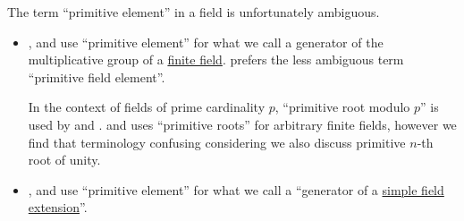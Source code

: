 \begin{remark}\label{rem:primitive_element_terminology}
  The term \enquote{primitive element} in a field is unfortunately ambiguous.

  \begin{itemize}
    \item \Textcite[66]{Rotman2015AdvancedModernAlgebraPart1}, \textcite[124]{Albert1956HigherAlgebra} and \textcite[def. 2.9]{LidlNiederreiter1997FiniteFields} use \enquote{primitive element} for what we call a generator of the multiplicative group of a \hyperref[def:finite_field]{finite field}. \Textcite[89]{Berlekamp2015AlgebraicCodingTheory} prefers the less ambiguous term \enquote{primitive field element}.

    In the context of fields of prime cardinality \( p \), \enquote{primitive root modulo \( p \)} is used by \textcite[12]{Gentle2006RandomNumberGeneration} and \textcite[def. 4.4.3]{Rosen2019DiscreteMathematics}. \Textcite[125]{Albert1956HigherAlgebra} and \textcite[thm. 11.2.2]{Hall1986CombinatorialTheory} uses \enquote{primitive roots} for arbitrary finite fields, however we find that terminology confusing considering we also discuss primitive \( n \)-th root of unity.

    \item \Textcite[A.V.40]{Bourbaki2003Algebra4to7}, \textcite[214]{Jacobson1985BasicAlgebraI} and \textcite[244]{Lang2002Algebra} use \enquote{primitive element} for what we call a \enquote{generator of a \hyperref[def:simple_field_extension]{simple field extension}}.
  \end{itemize}
\end{remark}

